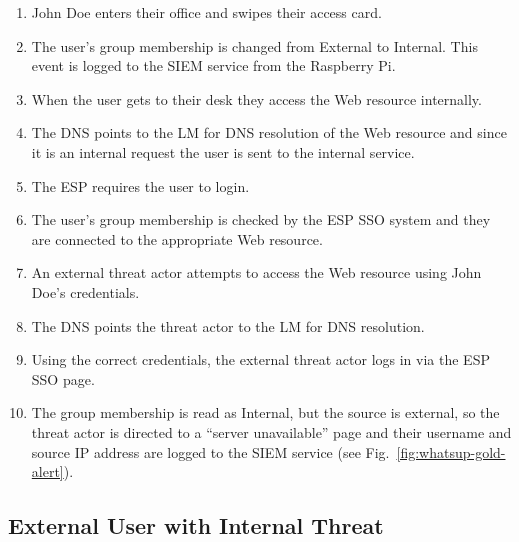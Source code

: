 \begin{enumerate}
\item John Doe enters their office and swipes their access card.
\item The user's group membership is changed from External to
  Internal.  This event is logged to the SIEM service from the
  Raspberry Pi.
\item When the user gets to their desk they access the Web resource
  internally.
\item The DNS points to the LM for DNS resolution of the Web resource
  and since it is an internal request the user is sent to the internal
  service.
\item The ESP requires the user to login.
\item The user's group membership is checked by the ESP SSO system and
  they are connected to the appropriate Web resource.
\item An external threat actor attempts to access the Web resource
  using John Doe's credentials.
\item The DNS points the threat actor to the LM for DNS resolution.
\item Using the correct credentials, the external threat actor logs in
  via the ESP SSO page.
\item The group membership is read as Internal, but the source is
  external, so the threat actor is directed to a ``server
  unavailable'' page and their username and source IP address are
  logged to the SIEM service (see Fig.~\ref{fig:whatsup-gold-alert}).
\end{enumerate}

\subsection{External User with Internal Threat}\label{sec:case-two}
